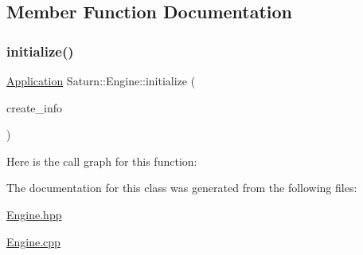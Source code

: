 \subsection{Member Function Documentation}
\mbox{\label{class_saturn_1_1_engine_acb3df3e4dbbafcef300403602d41e5fb}} 
\subsubsection{\texorpdfstring{initialize()}{initialize()}}
{\footnotesize\ttfamily \mbox{\hyperlink{class_saturn_1_1_application}{Application}} Saturn\+::\+Engine\+::initialize (\begin{DoxyParamCaption}\item[{\mbox{\hyperlink{struct_saturn_1_1_engine_1_1_create_info}{Create\+Info}}}]{create\+\_\+info }\end{DoxyParamCaption})\hspace{0.3cm}{\ttfamily [static]}}

Here is the call graph for this function\+:


The documentation for this class was generated from the following files\+:\begin{DoxyCompactItemize}
\item 
\mbox{\hyperlink{_engine_8hpp}{Engine.\+hpp}}\item 
\mbox{\hyperlink{_engine_8cpp}{Engine.\+cpp}}\end{DoxyCompactItemize}

